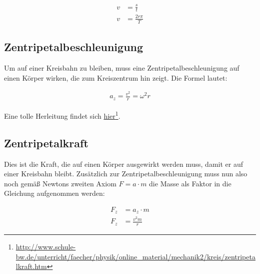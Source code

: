 \begin{align}
	v &=\frac{s}{t} \\
	v &=\frac{2r\pi}{T}
\end{align}


\subsection{Zentripetalbeschleunigung}
Um auf einer Kreisbahn zu bleiben, muss eine Zentripetalbeschleunigung auf einen Körper wirken, die zum Kreiszentrum hin zeigt. Die Formel lautet:

\begin{align}
	a_z=\frac{v^2}{r}=\omega^2 r
\end{align}

Eine tolle Herleitung findet sich \href{http://www.schule-bw.de/unterricht/faecher/physik/online\_material/mechanik2/kreis/zentripetalkraft.htm}{hier}\footnote{\url{http://www.schule-bw.de/unterricht/faecher/physik/online_material/mechanik2/kreis/zentripetalkraft.htm}}.

\subsection{Zentripetalkraft}

Dies ist die Kraft, die auf einen Körper ausgewirkt werden muss, damit er auf einer Kreisbahn bleibt. Zusätzlich zur Zentripetalbeschleunigung muss nun also noch gemäß Newtons zweiten Axiom $F=a \cdot m$ die Masse als Faktor in die Gleichung aufgenommen werden:

\begin{align}
	F_z &= a_z \cdot m \\
	F_z &= \frac{v^{2}m}{r}
\end{align}
